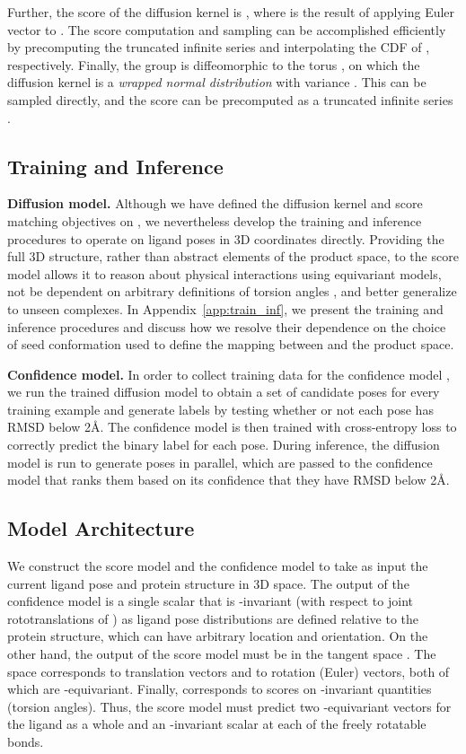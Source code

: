\documentclass{article} \usepackage{iclr2023_conference,times}
\begin{document}
Further, the score of the diffusion kernel is , where  is the result of applying Euler vector  to  \citep{yim2023se}. The score computation and sampling can be accomplished efficiently by precomputing the truncated infinite series and interpolating the CDF of , respectively. Finally, the  group is diffeomorphic to the torus , on which the diffusion kernel is a \emph{wrapped normal distribution} with variance . This can be sampled directly, and the score can be precomputed as a truncated infinite series \citep{jing2022torsional}.

\subsection{Training and Inference} \label{sec:train_inf}

\textbf{Diffusion model.} Although we have defined the diffusion kernel and score matching objectives on , we nevertheless develop the training and inference procedures to operate on ligand poses in 3D coordinates directly. Providing the full 3D structure, rather than abstract elements of the product space, to the score model allows it to reason about physical interactions using  equivariant models, not be dependent on arbitrary definitions of torsion angles \citep{jing2022torsional}, and better generalize to unseen complexes. In Appendix~\ref{app:train_inf}, we present the training and inference procedures and discuss how we resolve their dependence on the choice of seed conformation  used to define the mapping between  and the product space.

\textbf{Confidence model.} In order to collect training data for the confidence model , we run the trained diffusion model to obtain a set of candidate poses for every training example and generate labels by testing whether or not each pose has RMSD below 2\AA{}. The confidence model is then trained with cross-entropy loss to correctly predict the binary label for each pose. During inference, the diffusion model is run to generate  poses in parallel, which are passed to the confidence model that ranks them based on its confidence that they have RMSD below 2\AA{}. 


\subsection{Model Architecture} \label{sec:architecture}

We construct the score model  and the confidence model  to take as input the current ligand pose  and protein structure  in 3D space. The output of the confidence model is a single scalar that is -invariant (with respect to joint rototranslations of ) as ligand pose distributions are defined relative to the protein structure, which can have arbitrary location and orientation. On the other hand, the output of the score model must be in the tangent space . The space  corresponds to translation vectors and  to rotation (Euler) vectors, both of which are -equivariant. Finally,  corresponds to scores on -invariant quantities (torsion angles). Thus, the score model must predict two -equivariant vectors for the ligand as a whole and an -invariant scalar at each of the  freely rotatable bonds.
\end{document}
